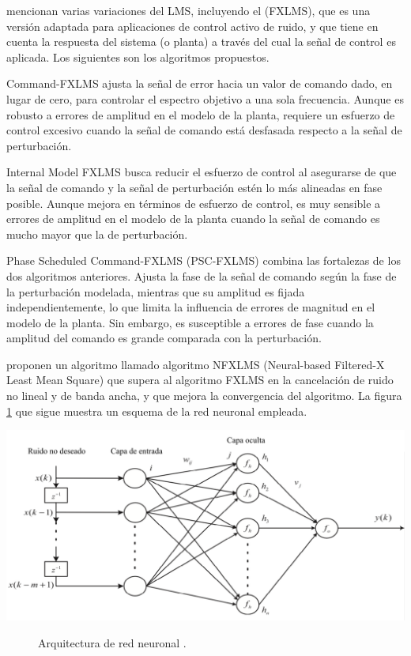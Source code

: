 \documentclass[a4paper,12pt]{article}
\begin{document}
\textcite{Rees2006} mencionan varias variaciones del LMS, incluyendo el  (FXLMS), que es una versión adaptada para aplicaciones de control activo de ruido, y que tiene en cuenta la respuesta del sistema (o planta) a través del cual la señal de control es aplicada.
Los siguientes son los algoritmos propuestos.

Command-FXLMS ajusta la señal de error hacia un valor de comando dado, en lugar de cero, para controlar el espectro objetivo a una sola frecuencia.
Aunque es robusto a errores de amplitud en el modelo de la planta, requiere un esfuerzo de control excesivo cuando la señal de comando está desfasada respecto a la señal de perturbación.

Internal Model FXLMS busca reducir el esfuerzo de control al asegurarse de que la señal de comando y la señal de perturbación estén lo más alineadas en fase posible.
Aunque mejora en términos de esfuerzo de control, es muy sensible a errores de amplitud en el modelo de la planta cuando la señal de comando es mucho mayor que la de perturbación.

Phase Scheduled Command-FXLMS (PSC-FXLMS) combina las fortalezas de los dos algoritmos anteriores.
Ajusta la fase de la señal de comando según la fase de la perturbación modelada, mientras que su amplitud es fijada independientemente, lo que limita la influencia de errores de magnitud en el modelo de la planta.
Sin embargo, es susceptible a errores de fase cuando la amplitud del comando es grande comparada con la perturbación.

\textcite{Chang2007} proponen un algoritmo llamado algoritmo NFXLMS (Neural-based Filtered-X Least Mean Square) que supera al algoritmo FXLMS en la cancelación de ruido no lineal y de banda ancha, y que mejora la convergencia del algoritmo.
La figura \ref{fig:Chang2007} que sigue muestra un esquema de la red neuronal empleada.

\begin{center}
    \includegraphics[width=\linewidth]{images/NFXLMS.png}
\end{center}
\vspace{\captionSpace}
\begin{figure}[H]
    \caption{Arquitectura de red neuronal \textcite[][3]{Chang2007}.}
    \label{fig:Chang2007}
\end{figure}
\end{document}
